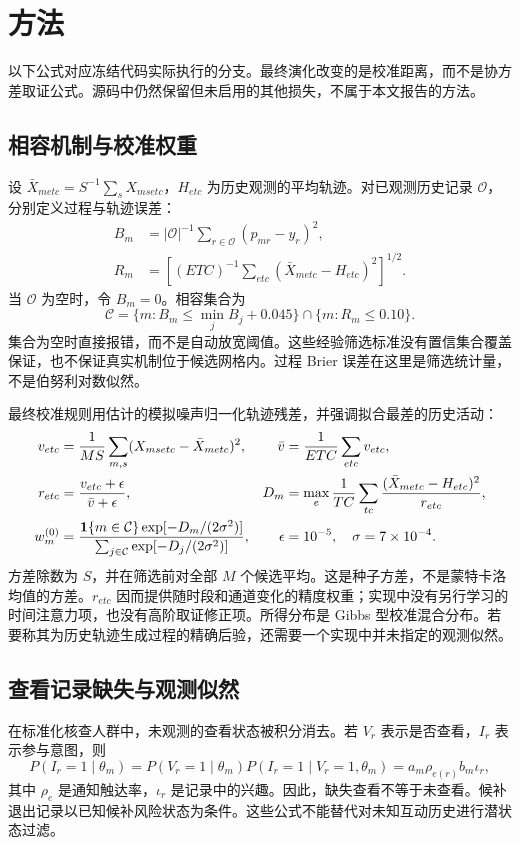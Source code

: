 \section{方法}
\label{sec:method}
以下公式对应冻结代码实际执行的分支。最终演化改变的是校准距离，而不是协方差取证公式。源码中仍然保留但未启用的其他损失，不属于本文报告的方法。

\subsection{相容机制与校准权重}
设 $\bar X_{metc}=S^{-1}\sum_sX_{msetc}$，$H_{etc}$ 为历史观测的平均轨迹。对已观测历史记录 $\mathcal O$，分别定义过程与轨迹误差：
\begin{align}
 B_m&=|\mathcal O|^{-1}\sum_{r\in\mathcal O}(p_{mr}-y_r)^2,\nonumber\\
 R_m&=\left[(ETC)^{-1}\sum_{etc}(\bar X_{metc}-H_{etc})^2\right]^{1/2}.
 \label{eq:compaterrors}
\end{align}
当 $\mathcal O$ 为空时，令 $B_m=0$。相容集合为
\begin{equation}
 \mathcal C=\{m:B_m\leq\min_j B_j+0.045\}\cap\{m:R_m\leq0.10\}.
 \label{eq:set}
\end{equation}
集合为空时直接报错，而不是自动放宽阈值。这些经验筛选标准没有置信集合覆盖保证，也不保证真实机制位于候选网格内。过程 Brier 误差在这里是筛选统计量，不是伯努利对数似然。

最终校准规则用估计的模拟噪声归一化轨迹残差，并强调拟合最差的历史活动：
\begin{align}
 v_{etc}&=\frac1{MS}\sum_{m,s}(X_{msetc}-\bar X_{metc})^2,
 &\bar v&=\frac1{ETC}\sum_{etc}v_{etc},\nonumber\\
 r_{etc}&=\frac{v_{etc}+\epsilon}{\bar v+\epsilon},
 &D_m&=\max_e\frac1{TC}\sum_{tc}\frac{(\bar X_{metc}-H_{etc})^2}{r_{etc}},\label{eq:distance}\\
 w_m^{(0)}&=\frac{\mathbf{1}\{m\in\mathcal C\}\exp[-D_m/(2\sigma^2)]}
 {\sum_{j\in\mathcal C}\exp[-D_j/(2\sigma^2)]},
 &\epsilon&=10^{-5},\quad\sigma=7\times10^{-4}.\label{eq:weights}
\end{align}
方差除数为 $S$，并在筛选前对全部 $M$ 个候选平均。这是种子方差，不是蒙特卡洛均值的方差。$r_{etc}$ 因而提供随时段和通道变化的精度权重；实现中没有另行学习的时间注意力项，也没有高阶取证修正项。所得分布是 Gibbs 型校准混合分布。若要称其为历史轨迹生成过程的精确后验，还需要一个实现中并未指定的观测似然。

\subsection{查看记录缺失与观测似然}
在标准化核查人群中，未观测的查看状态被积分消去。若 $V_r$ 表示是否查看，$I_r$ 表示参与意图，则
\begin{equation}
 P(I_r=1\mid\theta_m)=P(V_r=1\mid\theta_m)P(I_r=1\mid V_r=1,\theta_m)
 =a_m\rho_{e(r)}b_m\iota_r,
 \label{eq:view}
\end{equation}
其中 $\rho_e$ 是通知触达率，$\iota_r$ 是记录中的兴趣。因此，缺失查看不等于未查看。候补退出记录以已知候补风险状态为条件。这些公式不能替代对未知互动历史进行潜状态过滤。

